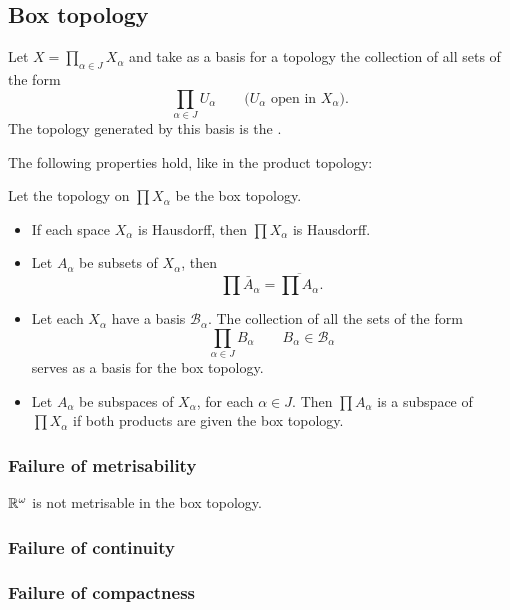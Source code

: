 \subsection{Box topology}
\begin{definition}
Let $X = \prod_{\alpha\in J}X_\alpha$ and take as a basis for a topology the collection of all sets of the form
\[ \prod_{\alpha\in J}U_\alpha \qquad \text{($U_\alpha$ open in $X_\alpha$)}. \]
The topology generated by this basis is the .
\end{definition}
The following properties hold, like in the product topology:
\begin{lemma}
Let the topology on $\prod X_\alpha$ be the box topology.
\begin{itemize}
\item If each space $X_\alpha$ is Hausdorff, then $\prod X_\alpha$ is Hausdorff.
\item Let $A_\alpha$ be subsets of $X_\alpha$, then
\[ \prod \bar{A}_\alpha = \overline{\prod A_\alpha}. \]
\item Let each $X_\alpha$ have a basis $\mathcal{B}_\alpha$. The collection of all the sets of the form 
\[ \prod_{\alpha\in J}B_\alpha \qquad B_\alpha\in\mathcal{B}_\alpha \]
serves as a basis for the box topology.
\item Let $A_\alpha$ be subspaces of $X_\alpha$, for each $\alpha\in J$. Then $\prod A_\alpha$ is a subspace of $\prod X_\alpha$ if both products are given the box topology.
\end{itemize}
\end{lemma}
\subsubsection{Failure of metrisability}
\begin{lemma}
$\mathbb{R}^\omega$ is not metrisable in the box topology.
\end{lemma}
\subsubsection{Failure of continuity}
\subsubsection{Failure of compactness}


